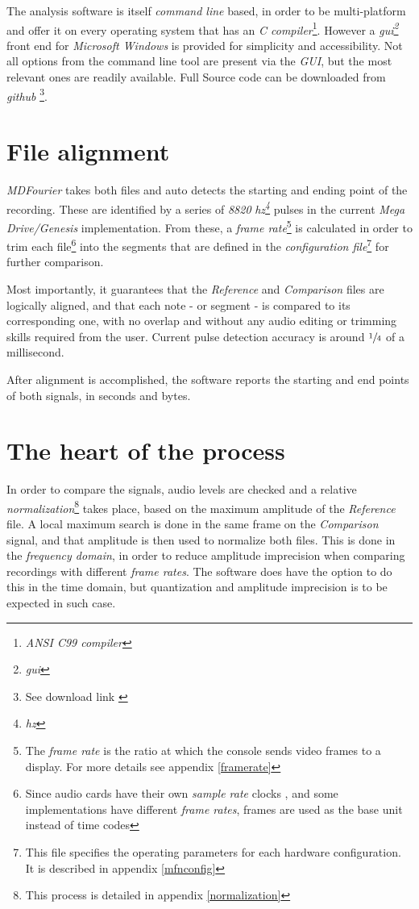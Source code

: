 \documentclass[10pt,a4paper]{report}
\newcommand{\define}[1] {
	\textit{\acrshort{#1}\footnote{\textit{\acrlong{#1}}}}}
\begin{document}
The analysis software is itself \textit{command line} based, in order to be multi-platform and offer it on every operating system that has an \textit{C compiler}\footnote{\textit{ANSI C99 compiler}}. However a \define{gui} front end for \textit{Microsoft Windows} is provided for simplicity and accessibility. Not all options from the command line tool are present via the \textit{GUI}, but the most relevant ones are readily available. Full Source code can be downloaded from \textit{github} \footnote{See download link \cite{sourcecode}}.

\section{File alignment}

\textit{MDFourier} takes both files and auto detects the starting and ending point of the recording. These are identified by a series of \textit{8820}\define{hz} pulses in the current \textit{Mega Drive/Genesis} implementation. From these, a \textit{frame rate}\footnote{The \textit{frame rate} is the ratio at which the console sends video frames to a display. For more details see appendix \ref{framerate}} is calculated in order to trim each file\footnote{Since audio cards have their own \textit{sample rate} clocks \cite{SoundCardClock} \cite{soundcardtiming} \cite{gwsoundcardtiming}, and some implementations have different \textit{frame rates}, frames are used as the base unit instead of time codes} into the segments that are defined in the \textit{configuration file}\footnote{This file specifies the operating parameters for each hardware configuration. It is described in appendix \ref{mfnconfig}} for further comparison.

Most importantly, it guarantees that the \textit{Reference} and \textit{Comparison} files are logically aligned, and that each note - or segment - is compared to its corresponding one, with no overlap and without any audio editing or trimming skills required from the user. Current pulse detection accuracy is around $\sfrac{1}{4}$ of a millisecond.

After alignment is accomplished, the software reports the starting and end points of both signals, in seconds and bytes.

\section{The heart of the process}

In order to compare the signals, audio levels are checked and a relative \textit{normalization}\footnote{This process is detailed in appendix \ref{normalization}} takes place, based on the maximum amplitude of the \textit{Reference} file. A local maximum search is done in the same frame on the \textit{Comparison} signal, and that amplitude is then used to normalize both files. This is done in the \textit{frequency domain}, in order to reduce amplitude imprecision when comparing recordings with different \textit{frame rates}. The software does have the option to do this in the time domain, but quantization and amplitude imprecision is to be expected in such case.
\end{document}
